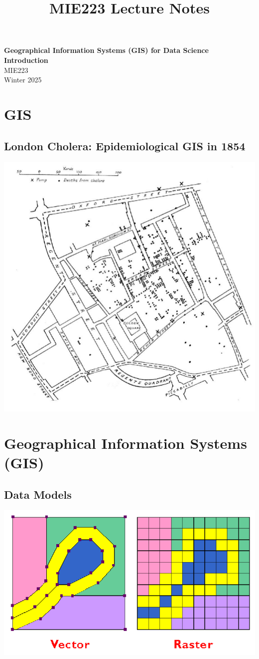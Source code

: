 \documentclass[11pt]{article}
\theoremstyle{definition}
\begin{document}
\setcounter{section}{0}
\title{MIE223 Lecture Notes}

\thispagestyle{empty}

\begin{center}
{\LARGE \bf Geographical Information Systems (GIS)
for Data Science Introduction}\\
{\large MIE223}\\
Winter 2025
\end{center}
\section{GIS}
\subsection{London Cholera:
Epidemiological GIS in 1854}
\includegraphics[width=\textwidth]{1.png}

\section{Geographical Information
Systems (GIS)}
\subsection{Data Models}
\includegraphics[width=\textwidth]{2.png}
\end{document}
